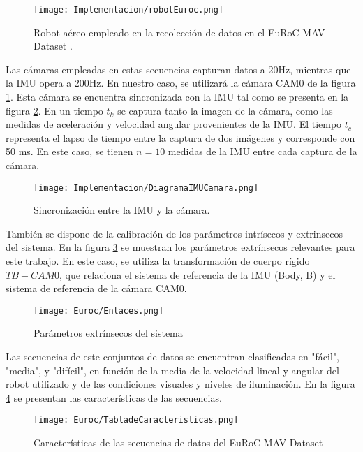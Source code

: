 \begin{figure}[H]
	\centering
	\texttt{[image: Implementacion/robotEuroc.png]}
	\caption{Robot aéreo empleado en la recolección de datos en el EuRoC MAV Dataset .}
	\label{fig:robotEuroc}
\end{figure}

Las cámaras empleadas en estas secuencias capturan datos a 20Hz, mientras que la IMU opera a 200Hz. En nuestro caso, se utilizará la cámara CAM0 de la figura \ref{fig:robotEuroc}. Esta cámara se encuentra sincronizada con la IMU tal como se presenta en la figura \ref{fig:sincronizacionEuroc}. En un tiempo $t_k$ se captura tanto la imagen de la cámara, como las medidas de aceleración y velocidad angular provenientes de la IMU. El tiempo $t_c$ representa el lapso de tiempo entre la captura de dos imágenes y corresponde con 50 ms. En este caso, se tienen $n = 10$ medidas de la IMU entre cada captura de la cámara. \\

\begin{figure}[H]
	\centering
	\texttt{[image: Implementacion/DiagramaIMUCamara.png]}
	\caption{Sincronización entre la IMU y la cámara.}
	\label{fig:sincronizacionEuroc}
\end{figure}

También se dispone de la calibración de los parámetros intrísecos y extrinsecos del sistema. En la figura \ref{fig:extrinsecosEuroc} se muestran los parámetros extrínsecos relevantes para este trabajo. En este caso, se utiliza la transformación de cuerpo rígido $T{B-CAM0}$, que relaciona el sistema de referencia de la IMU (Body, B) y el sistema de referencia de la cámara CAM0. 



\begin{figure}[H]
	\centering
	\texttt{[image: Euroc/Enlaces.png]}
	\caption{Parámetros extrínsecos del sistema}
	\label{fig:extrinsecosEuroc}
\end{figure}

Las secuencias de este conjuntos de datos se encuentran clasificadas en "fácil", "media", y "difícil",  en función de la media de la velocidad lineal y angular del robot utilizado y de las condiciones visuales y niveles de iluminación. En la figura \ref{fig:tablaDeCaracteristicas} se presentan las características de las secuencias. 

\begin{figure}[H]
	\centering
	\texttt{[image: Euroc/TabladeCaracteristicas.png]}
	\caption{Características de las secuencias de datos del EuRoC MAV Dataset}
	\label{fig:tablaDeCaracteristicas}
\end{figure}



